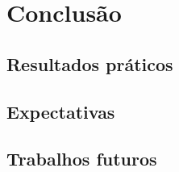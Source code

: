 \chapter{Conclusão}

\lipsum[1]

\section{Resultados práticos}\label{sec:resultados-praticos}
\lipsum[1]

\section{Expectativas}\label{sec:expectativas}
\lipsum[1]

\section{Trabalhos futuros}\label{sec:trabalhos-futuros}
\lipsum[1]
